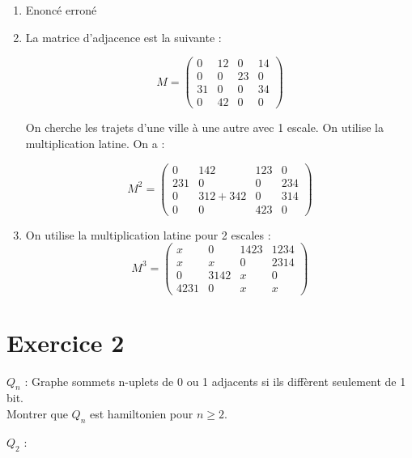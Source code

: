 \documentclass[12pt,a4paper]{article}
\begin{document}
\begin{enumerate}
    \item Enoncé erroné
    
    \item La matrice d'adjacence est la suivante :
    
    \[
    M = \begin{pmatrix}
    0 & 12 & 0 & 14 \\
    0 & 0 & 23 & 0 \\
    31 & 0 & 0 & 34 \\
    0 & 42 & 0 & 0
    \end{pmatrix}
    \]
    
    On cherche les trajets d'une ville à une autre avec 1 escale. On utilise la multiplication latine. On a :
    
    \[
    M^2 = \begin{pmatrix}
        0 & 142 & 123 & 0 \\
        231 & 0 & 0 & 234 \\
        0 & 312 + 342 & 0 & 314 \\
        0 & 0 & 423 & 0
    \end{pmatrix}
    \]    

    \item On utilise la multiplication latine pour 2 escales :
    \[
        M^3 = \begin{pmatrix}
            x & 0 & 1423 & 1234 \\
            x & x & 0 & 2314 \\
            0 & 3142 & x & 0 \\
            4231 & 0 & x & x
        \end{pmatrix}
        \]
\end{enumerate}

\color{black}

\section*{Exercice 2}
$Q_n$ : Graphe sommets n-uplets de 0 ou 1 adjacents si ils diffèrent seulement de 1 bit. \\

Montrer que $Q_n$ est hamiltonien pour $n \geq 2$.

\color{blue}

$Q_2$ :

\end{document}
